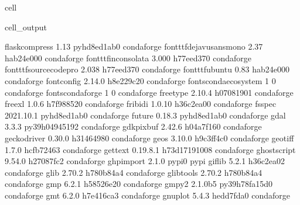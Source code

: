 \documentclass[letterpaper,table,10pt,english]{jupyterBook}
\begin{document}
\begin{sphinxuseclass}{cell}
\begin{sphinxVerbatimOutput}
\begin{sphinxuseclass}{cell_output}
\begin{sphinxVerbatim}[commandchars=\\\{\}]
flask\PYGZhy{}compress            1.13               pyhd8ed1ab\PYGZus{}0    conda\PYGZhy{}forge
font\PYGZhy{}ttf\PYGZhy{}dejavu\PYGZhy{}sans\PYGZhy{}mono 2.37                 hab24e00\PYGZus{}0    conda\PYGZhy{}forge
font\PYGZhy{}ttf\PYGZhy{}inconsolata      3.000                h77eed37\PYGZus{}0    conda\PYGZhy{}forge
font\PYGZhy{}ttf\PYGZhy{}source\PYGZhy{}code\PYGZhy{}pro  2.038                h77eed37\PYGZus{}0    conda\PYGZhy{}forge
font\PYGZhy{}ttf\PYGZhy{}ubuntu           0.83                 hab24e00\PYGZus{}0    conda\PYGZhy{}forge
fontconfig                2.14.0               h8e229c2\PYGZus{}0    conda\PYGZhy{}forge
fonts\PYGZhy{}conda\PYGZhy{}ecosystem     1                             0    conda\PYGZhy{}forge
fonts\PYGZhy{}conda\PYGZhy{}forge         1                             0    conda\PYGZhy{}forge
freetype                  2.10.4               h0708190\PYGZus{}1    conda\PYGZhy{}forge
freexl                    1.0.6                h7f98852\PYGZus{}0    conda\PYGZhy{}forge
fribidi                   1.0.10               h36c2ea0\PYGZus{}0    conda\PYGZhy{}forge
fsspec                    2021.10.1          pyhd8ed1ab\PYGZus{}0    conda\PYGZhy{}forge
future                    0.18.3             pyhd8ed1ab\PYGZus{}0    conda\PYGZhy{}forge
gdal                      3.3.3            py39h0494519\PYGZus{}2    conda\PYGZhy{}forge
gdk\PYGZhy{}pixbuf                2.42.6               h04a7f16\PYGZus{}0    conda\PYGZhy{}forge
geckodriver               0.30.0               h3146498\PYGZus{}0    conda\PYGZhy{}forge
geos                      3.10.0               h9c3ff4c\PYGZus{}0    conda\PYGZhy{}forge
geotiff                   1.7.0                hcfb7246\PYGZus{}3    conda\PYGZhy{}forge
gettext                   0.19.8.1          h73d1719\PYGZus{}1008    conda\PYGZhy{}forge
ghostscript               9.54.0               h27087fc\PYGZus{}2    conda\PYGZhy{}forge
ghp\PYGZhy{}import                2.1.0                    pypi\PYGZus{}0    pypi
giflib                    5.2.1                h36c2ea0\PYGZus{}2    conda\PYGZhy{}forge
glib                      2.70.2               h780b84a\PYGZus{}4    conda\PYGZhy{}forge
glib\PYGZhy{}tools                2.70.2               h780b84a\PYGZus{}4    conda\PYGZhy{}forge
gmp                       6.2.1                h58526e2\PYGZus{}0    conda\PYGZhy{}forge
gmpy2                     2.1.0b5          py39h78fa15d\PYGZus{}0    conda\PYGZhy{}forge
gmt                       6.2.0                h7e416ca\PYGZus{}3    conda\PYGZhy{}forge
gnuplot                   5.4.3                hedd7fda\PYGZus{}0    conda\PYGZhy{}forge

\end{sphinxVerbatim}
\end{sphinxuseclass}
\end{sphinxVerbatimOutput}
\end{sphinxuseclass}
\end{document}
